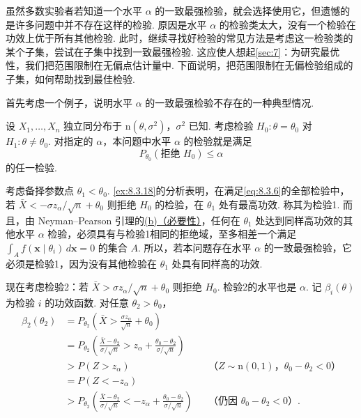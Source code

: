 虽然多数实验者若知道一个水平 $\alpha$ 的一致最强检验，就会选择使用它，但遗憾的是许多问题中并不存在这样的检验. 原因是水平 $\alpha$ 的检验类太大，没有一个检验在功效上优于所有其他检验. 此时，继续寻找好检验的常见方法是考虑这一检验类的某个子集，尝试在子集中找到一致最强检验. 这应使人想起\autoref{sec:7}：为研究最优性，我们把范围限制在无偏点估计量中. 下面说明，把范围限制在无偏检验组成的子集，如何帮助找到最佳检验.

首先考虑一个例子，说明水平 $\alpha$ 的一致最强检验不存在的一种典型情况.
\begin{example}[一致最强检验的不存在性]\label{ex:8.3.19}
设 $X_1,\ldots,X_n$ 独立同分布于 $\mathrm n(\theta,\sigma^2)$，$\sigma^2$ 已知. 考虑检验 $H_0:\theta=\theta_0$ 对 $H_1:\theta\ne\theta_0$. 对指定的 $\alpha$，本问题中水平 $\alpha$ 的检验就是满足
\begin{equation}\label{eq:8.3.6}P_{\theta_0}(\text{拒绝 }H_0)\le\alpha\end{equation}
的任一检验.

考虑备择参数点 $\theta_1<\theta_0$. \autoref{ex:8.3.18}的分析表明，在满足\eqref{eq:8.3.6}的全部检验中，若 $\bar X<-\sigma z_\alpha/\sqrt n+\theta_0$ 则拒绝 $H_0$ 的检验，在 $\theta_1$ 处有最高功效. 称其为检验1. 而且，由 Neyman–Pearson 引理的\hyperref[itm:thm:8.3.12:b]{(b)（必要性）}，任何在 $\theta_1$ 处达到同样高功效的其他水平 $\alpha$ 检验，必须具有与检验1相同的拒绝域，至多相差一个满足 $\int_A f(\boldsymbol x\mid\theta_i)\,d\boldsymbol x=0$ 的集合 $A$. 所以，若本问题存在水平 $\alpha$ 的一致最强检验，它必须是检验1，因为没有其他检验在 $\theta_1$ 处具有同样高的功效.

现在考虑检验2：若 $\bar X>\sigma z_\alpha/\sqrt n+\theta_0$ 则拒绝 $H_0$. 检验2的水平也是 $\alpha$. 记 $\beta_i(\theta)$ 为检验 $i$ 的功效函数. 对任意 $\theta_2>\theta_0$，
$$\begin{aligned}
\beta_2(\theta_2)&=P_{\theta_2}\left(\bar X>\frac{\sigma z_\alpha}{\sqrt n}+\theta_0\right)\\
&=P_{\theta_2}\left(\frac{\bar X-\theta_2}{\sigma/\sqrt n}>z_\alpha+\frac{\theta_0-\theta_2}{\sigma/\sqrt n}\right)\\
&>P(Z>z_\alpha)&&\text{（$Z\sim\mathrm n(0,1)$，$\theta_0-\theta_2<0$）}\\
&=P(Z<-z_\alpha)\\
&>P_{\theta_2}\left(\frac{\bar X-\theta_2}{\sigma/\sqrt n}<-z_\alpha+\frac{\theta_0-\theta_2}{\sigma/\sqrt n}\right)&&\text{（仍因 $\theta_0-\theta_2<0$）}.
\end{aligned}$$


\end{example}
